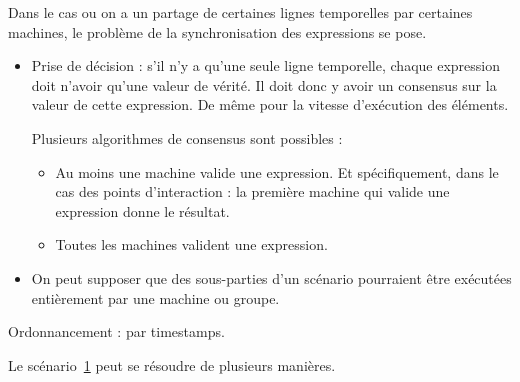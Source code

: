 \documentclass{article}
\begin{document}
Dans le cas ou on a un partage de certaines lignes temporelles par certaines machines, le problème de la synchronisation des expressions se pose.

\begin{itemize}
	\item Prise de décision : s'il n'y a qu'une seule ligne temporelle, chaque expression doit n'avoir qu'une valeur de vérité. Il doit donc y avoir un consensus sur la valeur de cette expression. De même pour la vitesse d'exécution des éléments.
    
    Plusieurs algorithmes de consensus sont possibles : 
    \begin{itemize}
        \item Au moins une machine valide une expression. 
        Et spécifiquement, dans le cas des points d'interaction : la première machine qui valide une expression donne le résultat.
        \item Toutes les machines valident une expression.
    \end{itemize}

	\item On peut supposer que des sous-parties d'un scénario pourraient être exécutées entièrement par une machine ou groupe.
\end{itemize}
Ordonnancement : par timestamps.

\begin{figure}[h]
    \centering
    \begin{tikzpicture}
    
    \end{tikzpicture}
    \label{scenar.trigger-1}
\end{figure}

Le scénario~\ref{scenar.trigger-1} peut se résoudre de plusieurs manières.
\end{document}
